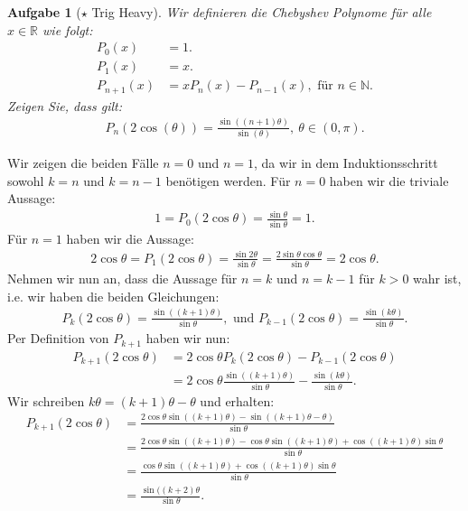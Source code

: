 \documentclass[a4paper, 20]{exam}
\newtheorem{ex}{Aufgabe}
\begin{document}
\begin{ex}[$\star$ Trig Heavy] Wir definieren die Chebyshev Polynome für alle $x \in \mathbb{R}$ wie folgt:
 \begin{align*}
 P_0(x)&= 1. \\
 P_1(x)&=x. \\
 P_{n+1}(x)& = xP_n(x) -P_{n-1}(x), \text{ für } n \in \mathbb{N}.
 \end{align*}
 Zeigen Sie, dass gilt:
 \begin{align*}
 P_n(2 \cos ( \theta)) = \frac{\sin ( (n+1) \theta)}{\sin( \theta)}, \ \theta \in (0, \pi ) .
 \end{align*}
\end{ex}
\begin{solution} Wir zeigen die  beiden Fälle $n=0$ und $n=1$, da wir in dem Induktionsschritt sowohl $k=n$ und $k=n-1$ benötigen werden. Für $n=0$ haben wir die triviale Aussage:
\begin{align*}
1 = P_0(2 \cos \theta) = \frac{\sin \theta}{\sin \theta}=1.
\end{align*}
Für $n=1$ haben wir die Aussage:
\begin{align*}
2 \cos  \theta = P_1( 2 \cos \theta) = \frac{\sin 2 \theta}{\sin \theta} = \frac{2 \sin \theta \cos \theta}{\sin \theta}= 2 \cos \theta.
\end{align*}
Nehmen wir nun an, dass die Aussage für $n=k$ und $n=k-1$ für $k>0$ wahr ist,  i.e. wir haben die beiden Gleichungen:
\begin{align*}
P_k(2 \cos \theta) = \frac{\sin ( (k+1) \theta)}{\sin \theta}, \text{ und } P_{k-1}( 2 \cos \theta) = \frac{\sin (k \theta)}{\sin \theta }.
\end{align*}
Per Definition von $P_{k+1}$ haben wir nun: 
\begin{align*}
P_{k+1}(2 \cos \theta) &= 2 \cos \theta P_k(2 \cos \theta) - P_{k-1}( 2 \cos \theta) \\
&= 2 \cos \theta \frac{\sin((k+1) \theta)}{\sin \theta} - \frac{\sin(k \theta)}{\sin \theta}.
\end{align*}
Wir schreiben $k \theta = (k+1) \theta - \theta $ und erhalten:
\begin{align*}
P_{k+1}( 2 \cos \theta) &= \frac{2 \cos \theta \sin((k+1) \theta)- \sin((k+1) \theta- \theta)}{\sin \theta } \\
&= \frac{2 \cos \theta \sin((k+1)\theta)- \cos \theta \sin((k+1)\theta) + \cos((k+1)\theta) \sin \theta}{\sin \theta} \\
&= \frac{\cos \theta \sin ((k+1)\theta)+ \cos((k+1)\theta) \sin \theta}{\sin \theta} \\
&= \frac{\sin((k+2) \theta}{\sin \theta }.
\end{align*}
\end{solution}
\end{document}
